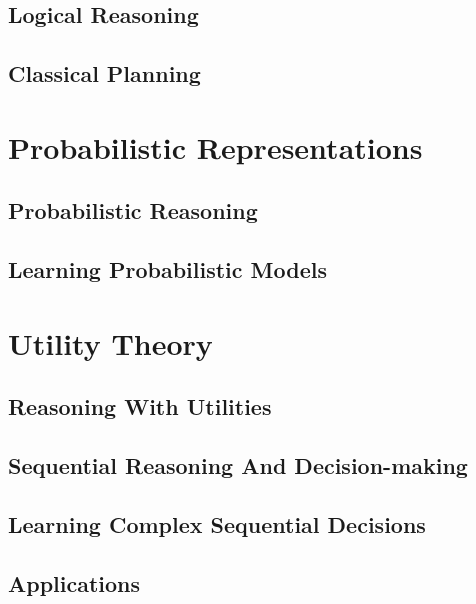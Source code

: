\documentclass[10pt, a4paper, oneside]{book}
\theoremstyle{theoremdd}
\theoremstyle{remark}
\begin{document}
\chapter{Logical Reasoning}
\chapter{Classical Planning}

\part{Probabilistic Representations}
\chapter{Probabilistic Reasoning}
\chapter{Learning Probabilistic Models}

\part{Utility Theory}
\chapter{Reasoning With Utilities}
\chapter{Sequential Reasoning And Decision-making}
\chapter{Learning Complex Sequential Decisions}
\chapter{Applications}
\end{document}
